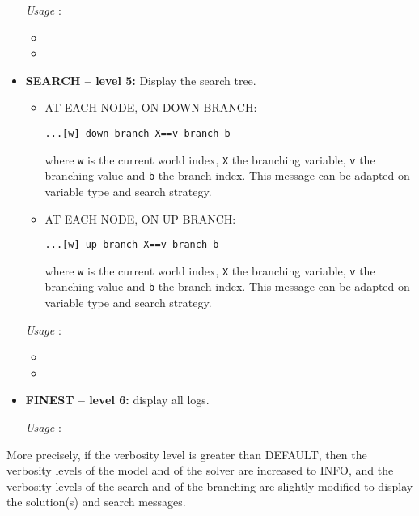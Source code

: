 \begin{itemize}
		\textit{Usage} : 
		\begin{itemize}
		\item {}
		\item {}
		\end{itemize}

	\item \textbf{SEARCH -- level 5:} Display the search tree.
		\begin{itemize}
			\item AT EACH NODE, ON DOWN BRANCH:
			\begin{lstlisting}
...[w] down branch X==v branch b
			\end{lstlisting}
where \texttt{w} is the current world index, \texttt{X} the branching variable, \texttt{v} the branching value and \texttt{b} the branch index. This message can be adapted on variable type and search strategy.

			\item AT EACH NODE, ON UP BRANCH:
			\begin{lstlisting}
...[w] up branch X==v branch b
			\end{lstlisting}
where \texttt{w} is the current world index, \texttt{X} the branching variable, \texttt{v} the branching value and \texttt{b} the branch index. This message can be adapted on variable type and search strategy.
		\end{itemize}
		
		\textit{Usage} : 
		\begin{itemize}
		\item {}
		\item {}
		\end{itemize}

	\item \textbf{FINEST -- level 6:} display all logs.
	
	\vspace{0.2cm} 
	\textit{Usage} :  

\end{itemize}

More precisely, if the verbosity level is greater than DEFAULT, then the verbosity levels of the model and of the solver are increased to INFO, and the verbosity levels of the search and of the branching are slightly modified to display the solution(s) and search messages.

